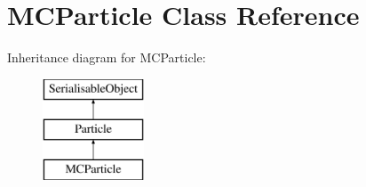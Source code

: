 \hypertarget{classMCParticle}{\section{M\-C\-Particle Class Reference}
\label{classMCParticle}
}
Inheritance diagram for M\-C\-Particle\-:\begin{figure}[H]
\begin{center}
\leavevmode
\includegraphics[height=3.000000cm]{classMCParticle}
\end{center}
\end{figure}

